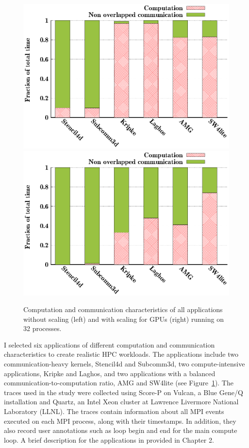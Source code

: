 \begin{figure}[t]
  \centering
  \includegraphics[width=0.8\columnwidth]{figure/val/mpi-scaled.eps}
  \includegraphics[width=0.8\columnwidth]{figure/val/mpi.eps}
  \caption{Computation and communication characteristics of all applications without scaling (left) and with scaling for GPUs (right)
running on 32 processes.} 
  \label{fig:trace_profile}
\end{figure}



\label{sec:applicationworkload}

I selected six applications of different computation and communication
characteristics to create realistic HPC workloads. The applications include two
communication-heavy kernels, Stencil4d\cite{bhatele2018evaluating} and Subcomm3d\cite{bhatele2018evaluating}, two compute-intensive
applications, Kripke\cite{kripke} and Laghos\cite{laghos}, and two applications with a balanced
communication-to-computation ratio, AMG\cite{amg} and SW4lite\cite{sjogreen2018sw4} (see
Figure~\ref{fig:trace_profile}).  The traces used in the study were
collected using Score-P \cite{knupfer2012score} on Vulcan, a Blue Gene/Q
installation and Quartz, an Intel Xeon cluster at Lawrence Livermore National
Laboratory (LLNL). The traces contain information about all MPI events executed on each MPI process, along with their
timestamps. In addition, they also record user annotations such as loop
begin and end for the main compute loop. A brief description for the applications in provided in Chapter 2. 


